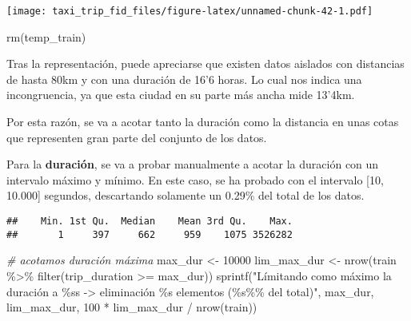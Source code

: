 \documentclass[
]{article}
\newenvironment{Shaded}{\begin{snugshade}}{\end{snugshade}}
\newcommand{\CommentTok}[1]{\textcolor[rgb]{0.56,0.35,0.01}{\textit{#1}}}
\newcommand{\DecValTok}[1]{\textcolor[rgb]{0.00,0.00,0.81}{#1}}
\newcommand{\FunctionTok}[1]{\textcolor[rgb]{0.00,0.00,0.00}{#1}}
\newcommand{\NormalTok}[1]{#1}
\newcommand{\OtherTok}[1]{\textcolor[rgb]{0.56,0.35,0.01}{#1}}
\newcommand{\SpecialCharTok}[1]{\textcolor[rgb]{0.00,0.00,0.00}{#1}}
\newcommand{\StringTok}[1]{\textcolor[rgb]{0.31,0.60,0.02}{#1}}
\begin{document}
\texttt{[image: taxi\_trip\_fid\_files/figure-latex/unnamed-chunk-42-1.pdf]}

\begin{Shaded}
\begin{Highlighting}[]
\FunctionTok{rm}\NormalTok{(temp\_train)}
\end{Highlighting}
\end{Shaded}

Tras la representación, puede apreciarse que existen datos aislados con
distancias de hasta 80km y con una duración de 16'6 horas. Lo cual nos
indica una incongruencia, ya que esta ciudad en su parte más ancha mide
13'4km.

Por esta razón, se va a acotar tanto la duración como la distancia en
unas cotas que representen gran parte del conjunto de los datos.

Para la \textbf{duración}, se va a probar manualmente a acotar la
duración con un intervalo máximo y mínimo. En este caso, se ha probado
con el intervalo {[}10, 10.000{]} segundos, descartando solamente un
0.29\% del total de los datos.

\begin{Shaded}
\end{Shaded}

\begin{verbatim}
##    Min. 1st Qu.  Median    Mean 3rd Qu.    Max. 
##       1     397     662     959    1075 3526282
\end{verbatim}

\begin{Shaded}
\begin{Highlighting}[]
\CommentTok{\# acotamos duración máxima}
\NormalTok{max\_dur }\OtherTok{\textless{}{-}} \DecValTok{10000}
\NormalTok{lim\_max\_dur }\OtherTok{\textless{}{-}} \FunctionTok{nrow}\NormalTok{(train }\SpecialCharTok{\%\textgreater{}\%} \FunctionTok{filter}\NormalTok{(trip\_duration }\SpecialCharTok{\textgreater{}=}\NormalTok{ max\_dur))}
\FunctionTok{sprintf}\NormalTok{(}\StringTok{"Límitando como máximo la duración a \%ss {-}\textgreater{} eliminación \%s elementos (\%s\%\% del total)"}\NormalTok{, max\_dur, lim\_max\_dur, }\DecValTok{100} \SpecialCharTok{*}\NormalTok{ lim\_max\_dur }\SpecialCharTok{/} \FunctionTok{nrow}\NormalTok{(train))}
\end{Highlighting}
\end{Shaded}
\end{document}
